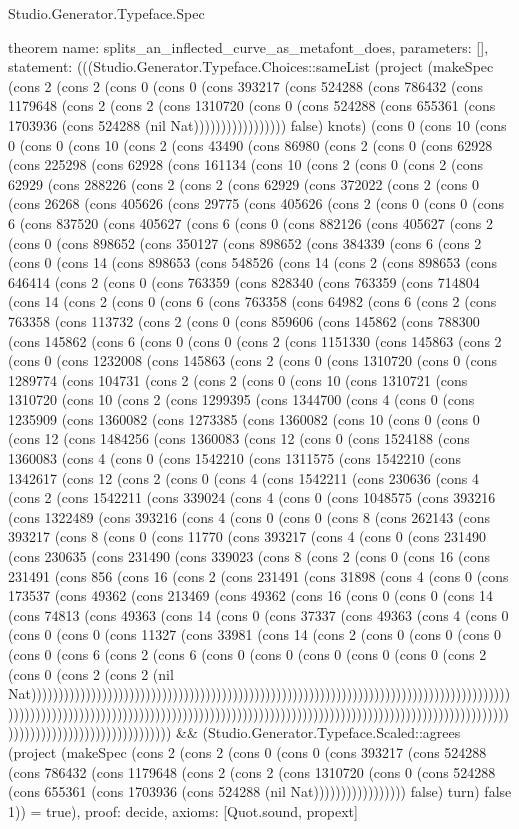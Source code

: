 \begin{lexlean}{Studio.Generator.Typeface.Spec}
\begin{semanticmodule}
theorem{
  name: splits_an_inflected_curve_as_metafont_does,
  parameters: [],
  statement: (((Studio.Generator.Typeface.Choices::sameList (project (makeSpec (cons 2 (cons 2 (cons 0 (cons 0 (cons 393217 (cons 524288 (cons 786432 (cons 1179648 (cons 2 (cons 2 (cons 1310720 (cons 0 (cons 524288 (cons 655361 (cons 1703936 (cons 524288 (nil Nat))))))))))))))))) false) knots) (cons 0 (cons 10 (cons 0 (cons 0 (cons 10 (cons 2 (cons 43490 (cons 86980 (cons 2 (cons 0 (cons 62928 (cons 225298 (cons 62928 (cons 161134 (cons 10 (cons 2 (cons 0 (cons 2 (cons 62929 (cons 288226 (cons 2 (cons 2 (cons 62929 (cons 372022 (cons 2 (cons 0 (cons 26268 (cons 405626 (cons 29775 (cons 405626 (cons 2 (cons 0 (cons 0 (cons 6 (cons 837520 (cons 405627 (cons 6 (cons 0 (cons 882126 (cons 405627 (cons 2 (cons 0 (cons 898652 (cons 350127 (cons 898652 (cons 384339 (cons 6 (cons 2 (cons 0 (cons 14 (cons 898653 (cons 548526 (cons 14 (cons 2 (cons 898653 (cons 646414 (cons 2 (cons 0 (cons 763359 (cons 828340 (cons 763359 (cons 714804 (cons 14 (cons 2 (cons 0 (cons 6 (cons 763358 (cons 64982 (cons 6 (cons 2 (cons 763358 (cons 113732 (cons 2 (cons 0 (cons 859606 (cons 145862 (cons 788300 (cons 145862 (cons 6 (cons 0 (cons 0 (cons 2 (cons 1151330 (cons 145863 (cons 2 (cons 0 (cons 1232008 (cons 145863 (cons 2 (cons 0 (cons 1310720 (cons 0 (cons 1289774 (cons 104731 (cons 2 (cons 2 (cons 0 (cons 10 (cons 1310721 (cons 1310720 (cons 10 (cons 2 (cons 1299395 (cons 1344700 (cons 4 (cons 0 (cons 1235909 (cons 1360082 (cons 1273385 (cons 1360082 (cons 10 (cons 0 (cons 0 (cons 12 (cons 1484256 (cons 1360083 (cons 12 (cons 0 (cons 1524188 (cons 1360083 (cons 4 (cons 0 (cons 1542210 (cons 1311575 (cons 1542210 (cons 1342617 (cons 12 (cons 2 (cons 0 (cons 4 (cons 1542211 (cons 230636 (cons 4 (cons 2 (cons 1542211 (cons 339024 (cons 4 (cons 0 (cons 1048575 (cons 393216 (cons 1322489 (cons 393216 (cons 4 (cons 0 (cons 0 (cons 8 (cons 262143 (cons 393217 (cons 8 (cons 0 (cons 11770 (cons 393217 (cons 4 (cons 0 (cons 231490 (cons 230635 (cons 231490 (cons 339023 (cons 8 (cons 2 (cons 0 (cons 16 (cons 231491 (cons 856 (cons 16 (cons 2 (cons 231491 (cons 31898 (cons 4 (cons 0 (cons 173537 (cons 49362 (cons 213469 (cons 49362 (cons 16 (cons 0 (cons 0 (cons 14 (cons 74813 (cons 49363 (cons 14 (cons 0 (cons 37337 (cons 49363 (cons 4 (cons 0 (cons 0 (cons 0 (cons 11327 (cons 33981 (cons 14 (cons 2 (cons 0 (cons 0 (cons 0 (cons 0 (cons 6 (cons 2 (cons 6 (cons 0 (cons 0 (cons 0 (cons 0 (cons 0 (cons 2 (cons 0 (cons 2 (cons 2 (nil Nat)))))))))))))))))))))))))))))))))))))))))))))))))))))))))))))))))))))))))))))))))))))))))))))))))))))))))))))))))))))))))))))))))))))))))))))))))))))))))))))))))))))))))))))))))))))))))))))))))))))))))))))))))) && (Studio.Generator.Typeface.Scaled::agrees (project (makeSpec (cons 2 (cons 2 (cons 0 (cons 0 (cons 393217 (cons 524288 (cons 786432 (cons 1179648 (cons 2 (cons 2 (cons 1310720 (cons 0 (cons 524288 (cons 655361 (cons 1703936 (cons 524288 (nil Nat))))))))))))))))) false) turn) false 1)) = true),
  proof: decide{},
  axioms: [Quot.sound, propext]
}

\end{semanticmodule}
\end{lexlean}
